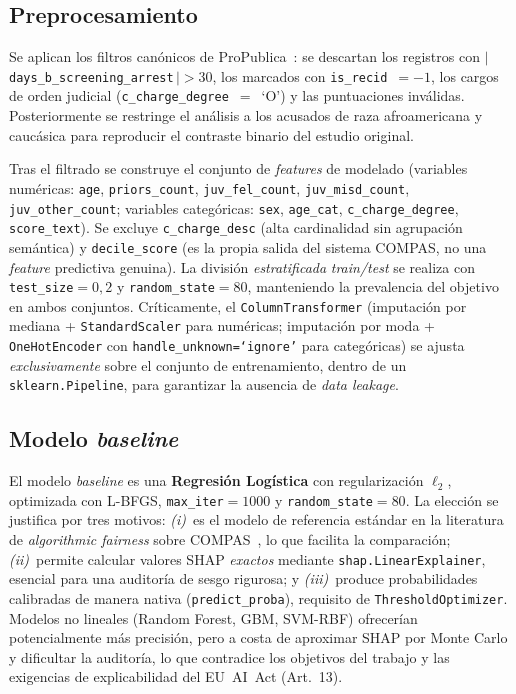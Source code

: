 \documentclass[11pt,a4paper]{article}
\begin{document}
\subsection{Preprocesamiento}
\label{sec:preproc}

Se aplican los filtros canónicos de ProPublica~\cite{propublica_compas_2016}: se descartan los registros con $|\,$\texttt{days\_b\_screening\_arrest}$\,|>30$, los marcados con \texttt{is\_recid}~$=-1$, los cargos de orden judicial (\texttt{c\_charge\_degree}~$=$~`O') y las puntuaciones inválidas. Posteriormente se restringe el análisis a los acusados de raza afroamericana y caucásica para reproducir el contraste binario del estudio original.

Tras el filtrado se construye el conjunto de \textit{features} de modelado (variables numéricas: \texttt{age}, \texttt{priors\_count}, \texttt{juv\_fel\_count}, \texttt{juv\_misd\_count}, \texttt{juv\_other\_count}; variables categóricas: \texttt{sex}, \texttt{age\_cat}, \texttt{c\_charge\_degree}, \texttt{score\_text}). Se excluye \texttt{c\_charge\_desc} (alta cardinalidad sin agrupación semántica) y \texttt{decile\_score} (es la propia salida del sistema COMPAS, no una \textit{feature} predictiva genuina). La división \emph{estratificada} \textit{train/test} se realiza con \texttt{test\_size}$=0{,}2$ y \texttt{random\_state}$=80$, manteniendo la prevalencia del objetivo en ambos conjuntos. Críticamente, el \texttt{ColumnTransformer} (imputación por mediana + \texttt{StandardScaler} para numéricas; imputación por moda + \texttt{OneHotEncoder} con \texttt{handle\_unknown=`ignore'} para categóricas) se ajusta \emph{exclusivamente} sobre el conjunto de entrenamiento, dentro de un \texttt{sklearn.Pipeline}, para garantizar la ausencia de \textit{data leakage}.

\subsection{Modelo \textit{baseline}}

El modelo \textit{baseline} es una \textbf{Regresión Logística} con regularización $\ell_2$, optimizada con L-BFGS, \texttt{max\_iter}$=1000$ y \texttt{random\_state}$=80$. La elección se justifica por tres motivos: \emph{(i)}~es el modelo de referencia estándar en la literatura de \textit{algorithmic fairness} sobre COMPAS~\cite{angwin2016machine, hardt2016equality, chouldechova2017fair}, lo que facilita la comparación; \emph{(ii)}~permite calcular valores SHAP \emph{exactos} mediante \texttt{shap.LinearExplainer}, esencial para una auditoría de sesgo rigurosa; y \emph{(iii)}~produce probabilidades calibradas de manera nativa (\texttt{predict\_proba}), requisito de \texttt{ThresholdOptimizer}. Modelos no lineales (Random Forest, GBM, SVM-RBF) ofrecerían potencialmente más precisión, pero a costa de aproximar SHAP por Monte Carlo y dificultar la auditoría, lo que contradice los objetivos del trabajo y las exigencias de explicabilidad del EU~AI~Act (Art.~13).
\end{document}
